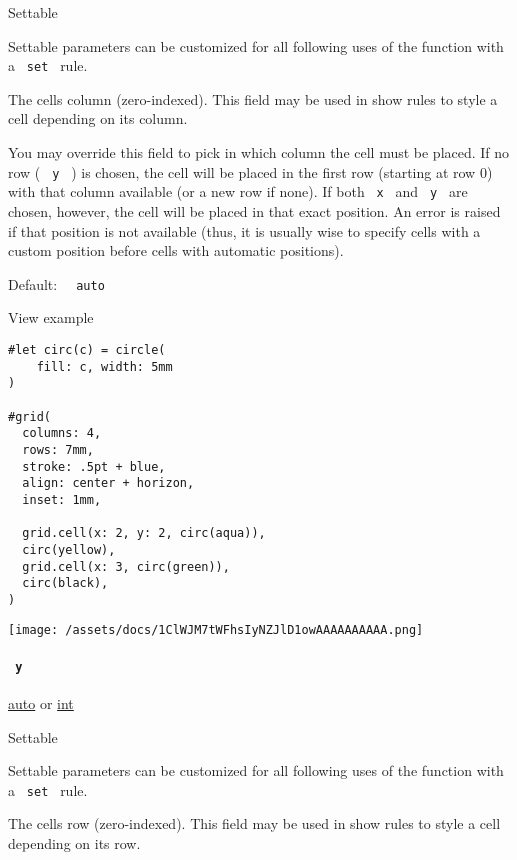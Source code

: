 {{ Settable }}

\label{definitions-cell-x-settable-tooltip}
Settable parameters can be customized for all following uses of the
function with a \texttt{\ set\ } rule.

The cell\textquotesingle s column (zero-indexed). This field may be used
in show rules to style a cell depending on its column.

You may override this field to pick in which column the cell must be
placed. If no row ( \texttt{\ y\ } ) is chosen, the cell will be placed
in the first row (starting at row 0) with that column available (or a
new row if none). If both \texttt{\ x\ } and \texttt{\ y\ } are chosen,
however, the cell will be placed in that exact position. An error is
raised if that position is not available (thus, it is usually wise to
specify cells with a custom position before cells with automatic
positions).

Default: \texttt{\ }{\texttt{\ auto\ }}\texttt{\ }


View example

\begin{verbatim}
#let circ(c) = circle(
    fill: c, width: 5mm
)

#grid(
  columns: 4,
  rows: 7mm,
  stroke: .5pt + blue,
  align: center + horizon,
  inset: 1mm,

  grid.cell(x: 2, y: 2, circ(aqua)),
  circ(yellow),
  grid.cell(x: 3, circ(green)),
  circ(black),
)
\end{verbatim}

\texttt{[image: /assets/docs/1ClWJM7tWFhsIyNZJlD1owAAAAAAAAAA.png]}

\paragraph{\texorpdfstring{\texttt{\ y\ }}{ y }}\label{definitions-cell-y}

\href{/docs/reference/foundations/auto/}{auto} {or}
\href{/docs/reference/foundations/int/}{int}

{{ Settable }}

\label{definitions-cell-y-settable-tooltip}
Settable parameters can be customized for all following uses of the
function with a \texttt{\ set\ } rule.

The cell\textquotesingle s row (zero-indexed). This field may be used in
show rules to style a cell depending on its row.

